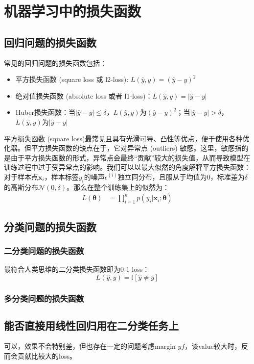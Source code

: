 \chapter{机器学习中的损失函数}

\section{回归问题的损失函数}

常见的回归问题的损失函数包括：
\begin{itemize}
  \item 平方损失函数 (square loss 或 l2-loss): $L(\hat{y}, y) = (\hat{y} - y)^2$
  \item 绝对值损失函数 (absolute loss 或者 l1-loss)：$L(\hat{y}, y) = |\hat{y} - y|$
  \item Huber损失函数：当$|\hat{y} - y|\leq\delta$，$L(\hat{y}, y)$为$(\hat{y} - y)^2$；当$|\hat{y} - y|>\delta$，$L(\hat{y}, y)$为$|\hat{y} - y|$
\end{itemize}

平方损失函数 (square loss)最常见且具有光滑可导、凸性等优点，便于使用各种优化器。但平方损失函数的缺点在于，它对异常点 (outliers) 敏感。这里，敏感指的是由于平方损失函数的形式，异常点会最终“贡献”较大的损失值，从而导致模型在训练过程中过于受异常点的影响。我们可以以最大似然的角度解释平方损失函数：对于样本点$\bm{x}_i$，样本标签$y_i$的噪声$\epsilon^{(i)}$独立同分布，且服从于均值为0，标准差为$\delta$的高斯分布$\mathcal{N}(0,\delta)$。那么在整个训练集上的似然为：
\begin{equation}
  \begin{aligned}
    L(\bm{\theta}) &= \prod_{i=1}^{n}{p(y_i|\bm{x}_i;\bm{\theta})}
  \end{aligned}
\end{equation}

\section{分类问题的损失函数}

\subsection{二分类问题的损失函数}

最符合人类思维的二分类损失函数即为0-1 loss：
\begin{equation}
  L(\hat{y}, y) = \mathbb{I}[\hat{y} \neq y]
\end{equation}

\subsection{多分类问题的损失函数}

\section{能否直接用线性回归用在二分类任务上}

可以，效果不会特别差，但也存在一定的问题考虑margin $yf$，该value较大时，反而会贡献比较大的loss。